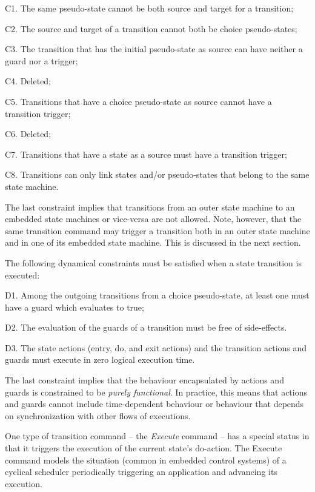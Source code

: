 \documentclass[a4paper,10pt]{article}
\newenvironment{fw_itemize}						%
{\begin{itemize}
  \setlength{\itemsep}{1mm}
  \setlength{\parskip}{0pt}
  \setlength{\parsep}{0pt}}
{\end{itemize}}
\begin{document}
\begin{fw_itemize} 
\item C1. The same pseudo-state cannot be both source and target for a transition;
\item C2. The source and target of a transition cannot both be choice pseudo-states;
\item C3. The transition that has the initial pseudo-state as source can have neither a guard nor a trigger;
\item C4. Deleted;
\item C5. Transitions that have a choice pseudo-state as source cannot have a transition trigger;
\item C6. Deleted;
\item C7. Transitions that have a state as a source must have a transition trigger;
\item C8. Transitions can only link states and/or pseudo-states that belong to the same state machine.
\end{fw_itemize}

The last constraint implies that transitions from an outer state machine to an embedded state
machines or vice-versa are not allowed. Note, however, that the same transition command may
trigger a transition both in an outer state machine and in one of its embedded state machine.
This is discussed in the next section.

The following dynamical constraints must be satisfied when a state transition is executed:

\begin{fw_itemize} 
\item D1. Among the outgoing transitions from a choice pseudo-state, at least one must have a
guard which evaluates to true;
\item D2. The evaluation of the guards of a transition must be free of side-effects.
\item D3. The state
actions (entry, do, and exit actions) and the transition actions and guards must execute
in zero logical execution time.
\end{fw_itemize}

The last constraint implies that the behaviour encapsulated by actions and guards is
constrained to be \emph{purely functional}. In practice, this means that actions and guards cannot
include time-dependent behaviour or behaviour that depends on synchronization with other
flows of executions.

One type of transition command – the \emph{Execute} command – has a special status in that it
triggers the execution of the current state's do-action. The Execute command models the
situation (common in embedded control systems) of a cyclical scheduler periodically
triggering an application and advancing its execution.
\end{document}

